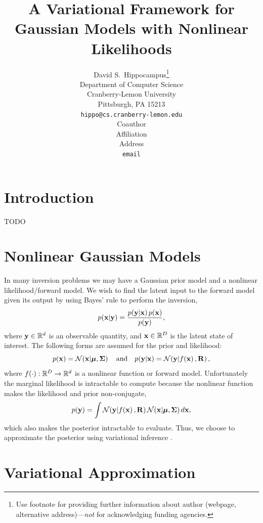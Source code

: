 \documentclass{article} %
\title{A Variational Framework for Gaussian Models with Nonlinear Likelihoods}
\author{
David S.~Hippocampus\thanks{Use footnote for providing further information
about author (webpage, alternative address)---\emph{not} for acknowledging
funding agencies.} \\
Department of Computer Science\\
Cranberry-Lemon University\\
Pittsburgh, PA 15213 \\
\texttt{hippo@cs.cranberry-lemon.edu} \\
\And
Coauthor \\
Affiliation \\
Address \\
\texttt{email} \\
}
\begin{document}
\maketitle

\begin{abstract}
\end{abstract}

\section{Introduction}

TODO


\section{Nonlinear Gaussian Models}

In many inversion problems we may have a Gaussian prior model and a nonlinear
likelihood/forward model. We wish to find the latent input to the forward
model given its output by using Bayes' rule to perform the inversion,
\begin{equation}
    p\!\left({\mathbf{x}}\middle\vert{\ensuremath{\mathbf{y}}}\right) = \frac{p\!\left({\mathbf{y}}\middle\vert{\ensuremath{\mathbf{x}}}\right)p\!\left({\mathbf{x}}\right)}
        {p\!\left({\mathbf{y}}\right)},
    \label{eq:bayesrule}
\end{equation}
where $\mathbf{y} \in \mathbb{R}^{d}$ is an observable quantity, and $\mathbf{x} \in \mathbb{R}^{D}$
is the latent state of interest. The following forms are assumed for the prior
and likelihood:
\begin{equation}
    p\!\left({\mathbf{x}}\right) = \mathcal{N}\!\left({\mathbf{x}}\middle\vert{\ensuremath{\boldsymbol{\mu}}, \ensuremath{\boldsymbol{\Sigma}}}\right)
    \quad \text{and} \quad
    p\!\left({\mathbf{y}}\middle\vert{\ensuremath{\mathbf{x}}}\right) = \mathcal{N}\!\left({\mathbf{y}}\middle\vert{\ensuremath{f\!\left({{\mathbf{x}}}\right)}, \ensuremath{\mathbf{R}}}\right),
    \label{eq:priorlike}
\end{equation}
where $f\!\left({{\cdot}}\right) : \mathbb{R}^{D} \to \mathbb{R}^{d}$ is a nonlinear function or
forward model. Unfortunately the marginal likelihood is intractable to compute
because the nonlinear function makes the likelihood and prior non-conjugate,
\begin{equation}
    p\!\left({\mathbf{y}}\right) = \int \mathcal{N}\!\left({\mathbf{y}}\middle\vert{\ensuremath{f\!\left({{\mathbf{x}}}\right)}, \ensuremath{\mathbf{R}}}\right)
        \mathcal{N}\!\left({\mathbf{x}}\middle\vert{\ensuremath{\boldsymbol{\mu}}, \ensuremath{\boldsymbol{\Sigma}}}\right) d\mathbf{x},
    \label{eq:marglike}
\end{equation}
which also makes the posterior intractable to evaluate. Thus, we choose to
approximate the posterior using variational inference \cite{}.


\section{Variational Approximation}
\end{document}
